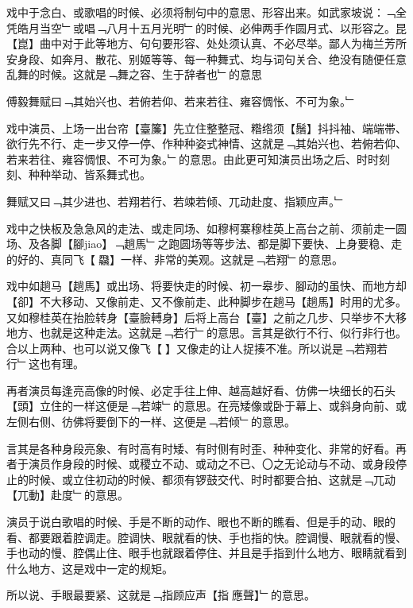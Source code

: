 戏中于念白、或歌唱的时候、必须将制句中的意思、形容出来。如武家坡说：﹁全凭皓月当空﹂或唱﹁八月十五月光明﹂的时候、必伸两手作圆月式、以形容之。昆【崑】曲中对于此等地方、句句要形容、处处须认真、不必尽举。鄙人为梅兰芳所安身段、如奔月、散花、别姬等等、每一种舞式、均与词句关合、绝没有随便任意乱舞的时候。这就是﹁舞之容、生于辞者也﹂的意思

\begin{preface}
  傅毅舞赋曰﹁其始兴也、若俯若仰、若来若往、雍容惆怅、不可为象。﹂
\end{preface}

戏中演员、上场一出台帘【臺簾】先立住整整冠、糌绺须【鬚】抖抖袖、端端帯、欲行先不行、走一步又停一停、作种种姿式神情、这就是﹁其始兴也、若俯若仰、若来若往、雍容惆恨、不可为象。﹂的意思。由此更可知演员出场之后、时时刻刻、种种举动、皆系舞式也。

\begin{preface}
  舞赋又曰﹁其少进也、若翔若行、若竦若倾、兀动赴度、指颖应声。﹂
\end{preface}

戏中之快板及急急风的走法、或走同场、如穆柯寨穆桂英上高台之前、须前走一圆场、及各脚【腳jiao】﹁趟馬﹂之跑圆场等等步法、都是脚下要快、上身要稳、走的好的、真同飞【𮸽飝】一样、非常的美观。这就是﹁若翔﹂的意思。

戏中如趟马【趟馬】或出场、将要快走的时候、初一皋步、腳动的虽快、而地方却【卻】不大移动、又像前走、又不像前走、此种脚步在趟马【趟馬】时用的尤多。又如穆桂英在抬脸转身【臺臉𨍭身】后将上高台【臺】之前之几步、只举步不大移地方、也就是这种走法。这就是﹁若行﹂的意思。言其是欲行不行、似行非行也。合以上两种、也可以说又像飞【𮸽】又像走的让人捉揍不准。所以说是﹁若翔若行﹂这也有理。

再者演员每逢亮高像的时候、必定手往上伸、越高越好看、仿佛一块细长的石头【頭】立住的一样这便是﹁若竦﹂的意思。在亮矮像或卧于幕上、或斜身向前、或左侧右侧、彷佛将要倒下的一样、这便是﹁若倾﹂的意思。

言其是各种身段亮象、有时高有时矮、有时侧有时歪、种种变化、非常的好看。再者于演员作身段的时候、或稷立不动、或动之不已、〇之无论动与不动、或身段停止的时候、或立住初动的时候、都须有锣鼓交代、时时都要合拍、这就是﹁兀动【兀動】赴度﹂的意思。

演员于说白歌唱的时候、手是不断的动作、眼也不断的瞧看、但是手的动、眼的看、都要跟着腔调走。腔调快、眼就看的快、手也指的快。腔调慢、眼就看的慢、手也动的慢、腔偶止住、眼手也就跟着停住、并且是手指到什么地方、眼睛就看到什么地方、这是戏中一定的规矩。

所以说、手眼最要紧、这就是﹁指顾应声【指𮸹應聲】﹂的意思。

